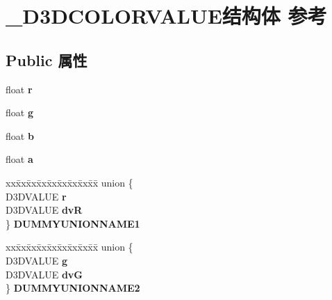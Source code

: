 \hypertarget{struct___d3_d_c_o_l_o_r_v_a_l_u_e}{}\section{\+\_\+\+D3\+D\+C\+O\+L\+O\+R\+V\+A\+L\+U\+E结构体 参考}
\label{struct___d3_d_c_o_l_o_r_v_a_l_u_e}
\subsection*{Public 属性}
\begin{DoxyCompactItemize}
\item 
\mbox{\label{struct___d3_d_c_o_l_o_r_v_a_l_u_e_a75fb19f8ec022e84b099bdc5752487bb}} 
float {\bfseries r}
\item 
\mbox{\label{struct___d3_d_c_o_l_o_r_v_a_l_u_e_a18fec1f24453c003d3452640808751ad}} 
float {\bfseries g}
\item 
\mbox{\label{struct___d3_d_c_o_l_o_r_v_a_l_u_e_aa89857d9c82cd634f3ec9089a9118296}} 
float {\bfseries b}
\item 
\mbox{\label{struct___d3_d_c_o_l_o_r_v_a_l_u_e_a9528343e467e5e4507052f4d36fa4f1b}} 
float {\bfseries a}
\item 
\mbox{\label{struct___d3_d_c_o_l_o_r_v_a_l_u_e_a6056a7b4a167a4500c7cbe91846b61a9}} 
\begin{tabbing}
xx\=xx\=xx\=xx\=xx\=xx\=xx\=xx\=xx\=\kill
union \{\\
\>D3DVALUE {\bfseries r}\\
\>D3DVALUE {\bfseries dvR}\\
\} {\bfseries DUMMYUNIONNAME1}\\

\end{tabbing}\item 
\mbox{\label{struct___d3_d_c_o_l_o_r_v_a_l_u_e_aaca3e6b02a63720cb91fb3f6fab362a2}} 
\begin{tabbing}
xx\=xx\=xx\=xx\=xx\=xx\=xx\=xx\=xx\=\kill
union \{\\
\>D3DVALUE {\bfseries g}\\
\>D3DVALUE {\bfseries dvG}\\
\} {\bfseries DUMMYUNIONNAME2}\\


\end{tabbing}
\end{DoxyCompactItemize}
